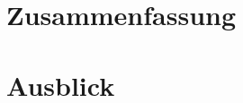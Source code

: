 \documentclass[fontsize=12pt,paper=a4,twoside=semi,parskip=half-,headsepline,headinclude]{scrreprt}
\begin{document}
\section{Zusammenfassung}

\section{Ausblick}



\printbibliography


%
%
%
%
%
%
%
\end{document}

